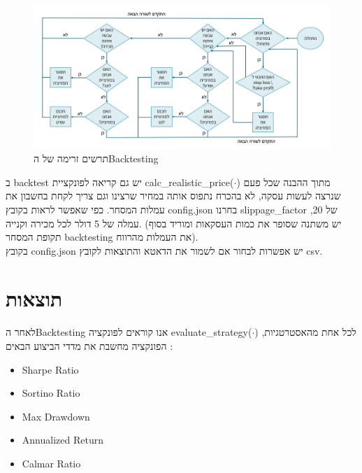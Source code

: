 \documentclass[a4paper,11pt]{article}
\newcommand{\te}[1]{\textenglish{#1}}
\begin{document}
\begin{RTL}
\begin{figure}[H]
    \centering
    \includegraphics[width=1\textwidth]{flow_chart.png}
    \caption{תרשים זרימה של ה\te{Backtesting}}
\end{figure}
ב \te{backtest} יש גם קריאה לפונקציית \te{calc\_realistic\_price($\cdot$)} מתוך ההבנה שכל פעם שנרצה לעשות עסקה, לא בהכרח נתפוס אותה במחיר שרצינו וגם צריך לקחת בחשבון את עמלות המסחר. כפי שאפשר לראות בקובץ \te{config.json} בחרנו \te{slippage\_factor} של 20, עמלה של 5 דולר לכל מכירה וקנייה. (יש משתנה שסופר את כמות העסקאות ומוריד בסוף תקופת המסחר \te{backtesting} את העמלות מהרווח).
\\ בקובץ \te{config.json} יש אפשרות לבחור אם לשמור את הדאטא והתוצאות לקובץ \te{csv}.
\section{תוצאות}
לאחר ה\te{Backtesting} אנו קוראים לפונקציה \te{evaluate\_strategy($\cdot$)} לכל אחת מהאסטרטגיות, הפונקציה מחשבת את מדדי הביצוע הבאים :
\begin{itemize}
    \item \te{Sharpe Ratio}
    \item \te{Sortino Ratio}
    \item \te{Max Drawdown}
    \item \te{Annualized Return}
    \item \te{Calmar Ratio}
\end{itemize}


\end{RTL}
\end{document}
